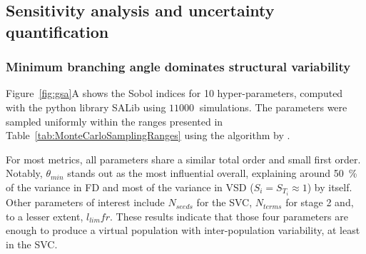 \documentclass[11pt,]{article}
\begin{document}
\subsection{Sensitivity analysis and uncertainty quantification}\label{sec:gsaUQ}

\subsubsection{Minimum branching angle dominates structural variability}\label{sec:gsa}

Figure~\ref{fig:gsa}A shows the Sobol indices for \SI{10}{} hyper-parameters, computed with the python library SALib\cite{Iwanaga_2022,Herman_2017} using $\SI{11000}{}$ simulations.
The parameters were sampled uniformly within the ranges presented in Table~\ref{tab:MonteCarloSamplingRanges} using the algorithm by \citet{Saltelli2002}.

For most metrics, all parameters share a similar total order and small first order.
Notably, $\theta_{min}$ stands out as the most influential overall, explaining around \SI{50}{\percent} of the variance in FD and most of the variance in VSD ($S_i=S_{T_i}\approx 1$) by itself.
Other parameters of interest include $N_{seeds}$ for the SVC, $N_{terms}$ for stage 2 and, to a lesser extent, $l_{lim}fr$.
These results indicate that those four parameters are enough to produce a virtual population with inter-population variability, at least in the SVC.

\begin{table}[ht!]
  \centering
  \caption{\label{tab:MonteCarloSamplingRanges}Ranges for the hyper-parameters for the computation of Sobol indices.}
\end{table}
\end{document}
